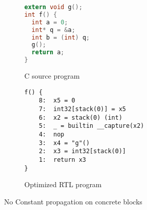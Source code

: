 \begin{figure}
\begin{subfigure}{.48\textwidth}
  \begin{lstlisting}[language=C]
extern void g();
int f() {
  int a = 0;
  int* q = &a;
  int b = (int) q;
  g();
  return a;
}
\end{lstlisting}
  \caption{C source program}
\end{subfigure}
\begin{subfigure}{.48\textwidth}
  \begin{lstlisting}
f() {
    8:	x5 = 0
    7:	int32[stack(0)] = x5
    6:	x2 = stack(0) (int)
    5:	_ = builtin __capture(x2)
    4:	nop
    3:	x4 = "g"()
    2:	x3 = int32[stack(0)]
    1:	return x3
}
\end{lstlisting}
  \caption{Optimized RTL program}
\end{subfigure}
\caption{No Constant propagation on concrete blocks}
\label{fig:cpconcrete}
\end{figure}
